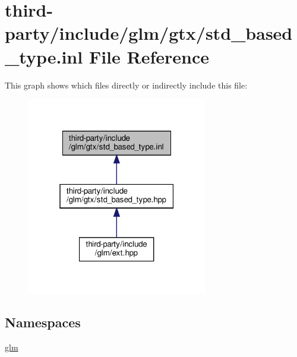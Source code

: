 \hypertarget{std__based__type_8inl}{}\section{third-\/party/include/glm/gtx/std\+\_\+based\+\_\+type.inl File Reference}
\label{std__based__type_8inl}
This graph shows which files directly or indirectly include this file\+:
\nopagebreak
\begin{figure}[H]
\begin{center}
\leavevmode
\includegraphics[width=223pt]{std__based__type_8inl__dep__incl}
\end{center}
\end{figure}
\subsection*{Namespaces}
\begin{DoxyCompactItemize}
\item 
 \hyperlink{namespaceglm}{glm}
\end{DoxyCompactItemize}
